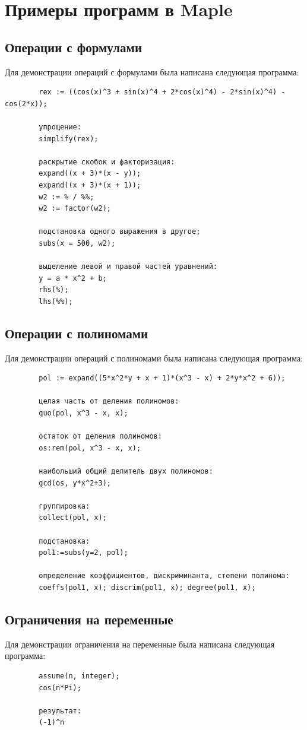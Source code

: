 \documentclass[a4paper,14pt]{extarticle}
\begin{document}
    \section{Примеры программ в Maple}
    
    \subsection{Операции с формулами}
    Для демонстрации операций с формулами была написана следующая программа:
    \begin{lstlisting}
        rex := ((cos(x)^3 + sin(x)^4 + 2*cos(x)^4) - 2*sin(x)^4) - cos(2*x));

        упрощение:
        simplify(rex);
                               
        раскрытие скобок и факторизация:
        expand((x + 3)*(x - y));
        expand((x + 3)*(x + 1));
        w2 := % / %%;
        w2 := factor(w2);

        подстановка одного выражения в другое;
        subs(x = 500, w2);

        выделение левой и правой частей уравнений:
        y = a * x^2 + b;
        rhs(%);
        lhs(%%);
    \end{lstlisting}

    \subsection{Операции с полиномами}
    Для демонстрации операций с полиномами была написана следующая программа:
    \begin{lstlisting}
        pol := expand((5*x^2*y + x + 1)*(x^3 - x) + 2*y*x^2 + 6));
        
        целая часть от деления полиномов:
        quo(pol, x^3 - x, x);

        остаток от деления полиномов:
        os:rem(pol, x^3 - x, x);

        наибольший общий делитель двух полиномов:
        gcd(os, y*x^2+3);

        группировка:
        collect(pol, x);

        подстановка:
        pol1:=subs(y=2, pol);

        определение коэффициентов, дискриминанта, степени полинома:
        coeffs(pol1, x); discrim(pol1, x); degree(pol1, x);
    \end{lstlisting}

    \subsection{Ограничения на переменные}
    Для демонстрации ограничения на переменные была написана следующая программа:
    \begin{lstlisting}
        assume(n, integer); 
        cos(n*Pi);

        результат:
        (-1)^n
    \end{lstlisting}
\end{document}
